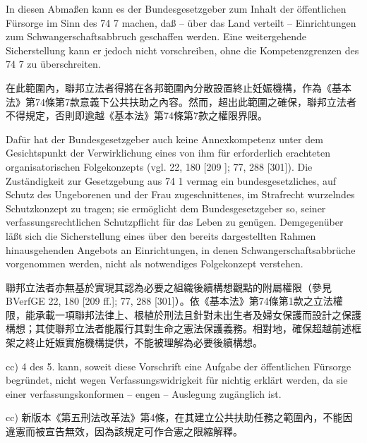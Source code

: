 \documentclass[12pt]{article}
\begin{document}
\begin{sourcepara}[title={原文E.245}]
In diesen Abmaßen kann es der Bundesgesetzgeber zum Inhalt der öffentlichen Fürsorge im Sinn des \abbrArt{} 74 \abbrNr{} 7 \abbrGG{}\ggfnArtSeventyFourSevenDE{} machen, daß -- über das Land verteilt -- Einrichtungen zum Schwangerschaftsabbruch geschaffen werden. Eine weitergehende Sicherstellung kann er jedoch nicht vorschreiben, ohne die Kompetenzgrenzen des \abbrArt{} 74 \abbrNr{} 7 \abbrGG{}\ggfnArtSeventyFourSevenDE{} zu überschreiten.
\end{sourcepara}
\begin{transpara}
在此範圍內，聯邦立法者得將在各邦範圍內分散設置終止妊娠機構，作為《基本法》第74條第7款\ggfnArtSeventyFourSevenZH{}意義下公共扶助之內容。然而，超出此範圍之確保，聯邦立法者不得規定，否則即逾越《基本法》第74條第7款\ggfnArtSeventyFourSevenZH{}之權限界限。
\end{transpara}

\begin{sourcepara}[title={原文E.246}]
Dafür hat der Bundesgesetzgeber auch keine Annexkompetenz unter dem Gesichtspunkt der Verwirklichung eines von ihm für erforderlich erachteten organisatorischen Folgekonzepts (vgl. \abbrBVerfGE{} 22, 180 [209 \abbrFF{}]; 77, 288 [301]). Die Zuständigkeit zur Gesetzgebung aus \abbrArt{} 74 \abbrNr{} 1 \abbrGG{}\ggfnArtSeventyFourOneDE{} vermag ein bundesgesetzliches, auf Schutz des Ungeborenen und der Frau zugeschnittenes, im Strafrecht wurzelndes Schutzkonzept zu tragen; sie ermöglicht dem Bundesgesetzgeber so, seiner verfassungsrechtlichen Schutzpflicht für das Leben zu genügen. Demgegenüber läßt sich die Sicherstellung eines über den bereits dargestellten Rahmen hinausgehenden Angebots an Einrichtungen, in denen Schwangerschaftsabbrüche vorgenommen werden, nicht als notwendiges Folgekonzept verstehen.
\end{sourcepara}
\begin{transpara}
聯邦立法者亦無基於實現其認為必要之組織後續構想觀點的附屬權限（參見 BVerfGE 22, 180 [209 ff.]; 77, 288 [301]）。依《基本法》第74條第1款\ggfnArtSeventyFourOneZH{}之立法權限，能承載一項聯邦法律上、根植於刑法且針對未出生者及婦女保護而設計之保護構想；其使聯邦立法者能履行其對生命之憲法保護義務。相對地，確保超越前述框架之終止妊娠實施機構提供，不能被理解為必要後續構想。
\end{transpara}

\begin{sourcepara}[title={原文E.247}]
cc) \abbrArt{} 4 des 5. \abbrStrRG{} \abbrNF{} kann, soweit diese Vorschrift eine Aufgabe der öffentlichen Fürsorge begründet, nicht wegen Verfassungswidrigkeit für nichtig erklärt werden, da sie einer verfassungskonformen -- engen -- Auslegung zugänglich ist.
\end{sourcepara}
\begin{transpara}
cc) 新版本《第五刑法改革法》第4條，在其建立公共扶助任務之範圍內，不能因違憲而被宣告無效，因為該規定可作合憲之限縮解釋。
\end{transpara}
\end{document}

